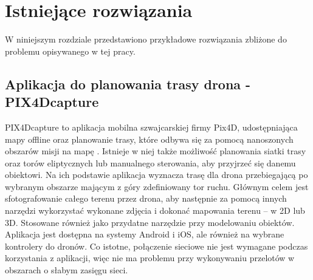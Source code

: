 \chapter{Istniejące rozwiązania}
\label{chap:example solutions}

W niniejszym rozdziale przedstawiono przykładowe rozwiązania zbliżone do problemu opisywanego w tej pracy.

\section{Aplikacja do planowania trasy drona - PIX4Dcapture}

PIX4Dcapture to aplikacja mobilna szwajcarskiej firmy Pix4D, udostępniająca mapy offline oraz planowanie trasy, które odbywa się za pomocą nanoszonych obszarów misji na mapę \cite{pix4dcapture}. Istnieje w niej także możliwość planowania siatki trasy oraz torów eliptycznych lub manualnego sterowania, aby przyjrzeć się danemu obiektowi. Na ich podstawie aplikacja wyznacza trasę dla drona przebiegającą po wybranym obszarze mającym z góry zdefiniowany tor ruchu. Głównym celem jest sfotografowanie całego terenu przez drona, aby następnie za pomocą innych narzędzi wykorzystać wykonane zdjęcia i dokonać mapowania terenu – w 2D lub 3D. Stosowane również jako przydatne narzędzie przy modelowaniu obiektów. Aplikacja jest dostępna na systemy Android i iOS, ale również na wybrane kontrolery do dronów. Co istotne, połączenie sieciowe nie jest wymagane podczas korzystania z aplikacji, więc nie ma problemu przy wykonywaniu przelotów w obszarach o słabym zasięgu sieci.

